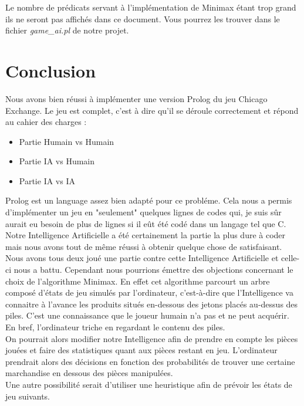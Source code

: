 \documentclass[a4paper, 11pt,twoside, leqno]{report}
\theoremstyle{plain}
\begin{document}
Le nombre de prédicats servant à l'implémentation de Minimax étant trop grand ils ne seront pas affichés dans ce document. Vous pourrez les trouver dans le fichier \textit{game\_{}ai.pl} de notre projet.


\chapter{Conclusion}
Nous avons bien réussi à implémenter une version Prolog du jeu Chicago Exchange. Le jeu est complet, c'est à dire qu'il se déroule correctement et répond au cahier des charges :
\begin{itemize}
   \item Partie Humain vs Humain
   \item Partie IA vs Humain
   \item Partie IA vs IA
\end{itemize}
Prolog est un language assez bien adapté pour ce probléme. Cela nous a permis d'implémenter un jeu en "seulement" quelques lignes de codes qui, je suis sûr aurait eu besoin de plus de lignes si il eût été codé dans un langage tel que C.\\
Notre Intelligence Artificielle a été certainement la partie la plus dure à coder mais nous avons tout de même réussi à obtenir quelque chose de satisfaisant. Nous avons tous deux joué une partie contre cette Intelligence Artificielle et celle-ci nous a battu. Cependant nous pourrions émettre des objections concernant le choix de l'algorithme Minimax. En effet cet algorithme parcourt un arbre composé d'états de jeu simulés par l'ordinateur, c'est-à-dire que l'Intelligence va connaitre à l'avance les produits situés en-dessous des jetons placés au-dessus des piles. C'est une connaissance que le joueur humain n'a pas et ne peut acquérir. En bref, l'ordinateur triche en regardant le contenu des piles.\\
On pourrait alors modifier notre Intelligence afin de prendre en compte les pièces jouées et faire des statistiques quant aux pièces restant en jeu. L'ordinateur prendrait alors des décisions en fonction des probabilités de trouver une certaine marchandise en dessous des pièces manipulées.\\
Une autre possibilité serait d'utiliser une heuristique afin de prévoir les états de jeu suivants.
     
\end{document}
